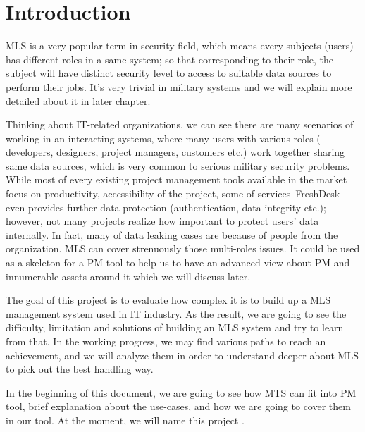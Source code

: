 
\chapter{Introduction} %

\label{ch:introduction} %


MLS is a very popular term in security field, which means every subjects (\ie users) has different roles in a same system;
so that corresponding to their role, the subject will have distinct security level to access to suitable data sources to perform their jobs.
It's very trivial in military systems and we will explain more detailed about it in later chapter.

Thinking about IT-related organizations, we can see there are many scenarios of working in an interacting systems, where many users with various roles (\eg\,developers, designers, project managers, customers etc.) work together sharing same data sources, which is very common to serious military security problems.
While most of every existing project management tools available in the market focus on productivity, accessibility of the project, some of services \eg\,FreshDesk even provides further data protection (authentication, data integrity etc.);
however, not many projects realize how important to protect users' data internally. In fact, many of data leaking cases are because of people from the organization. MLS can cover strenuously those multi-roles issues. It could be used as a skeleton for a PM tool to help us to have an advanced view about PM and innumerable assets around it which we will discuss later.

The goal of this project is to evaluate how complex it is to build up a MLS management system used in IT industry.
As the result, we are going to see the difficulty, limitation and solutions of building an MLS system and try to learn from that.
In the working progress, we may find various paths to reach an achievement, and we will analyze them in order to understand deeper about MLS to pick out the best handling way.

In the beginning of this document, we are going to see how MTS can fit into PM tool, brief explanation about the use-cases, and how we are going to cover them in our tool.
At the moment, we will name this project \myProject.

